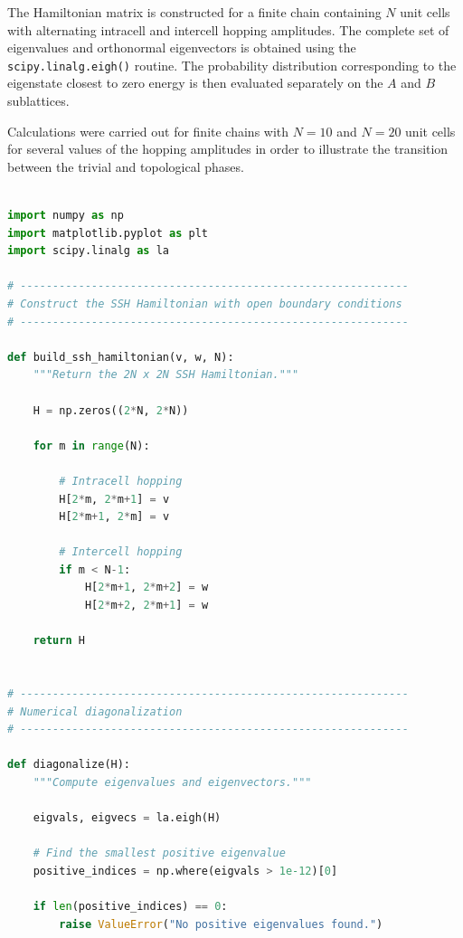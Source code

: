 \documentclass[11pt, a4paper]{article}
\begin{document}
The Hamiltonian matrix is constructed for a finite chain containing \(N\) unit cells with alternating intracell and intercell hopping amplitudes. The complete set of eigenvalues and orthonormal eigenvectors is obtained using the \texttt{scipy.linalg.eigh()} routine. The probability distribution corresponding to the eigenstate closest to zero energy is then evaluated separately on the \(A\) and \(B\) sublattices.

Calculations were carried out for finite chains with \(N=10\) and \(N=20\) unit cells for several values of the hopping amplitudes in order to illustrate the transition between the trivial and topological phases.

\begin{lstlisting}[language=Python,
caption={Python implementation used to construct and diagonalize the finite SSH Hamiltonian with open boundary conditions and generate the corresponding energy spectra and edge-state probability distributions.},
label={lst:ssh_finite}]

import numpy as np
import matplotlib.pyplot as plt
import scipy.linalg as la

# ------------------------------------------------------------
# Construct the SSH Hamiltonian with open boundary conditions
# ------------------------------------------------------------

def build_ssh_hamiltonian(v, w, N):
    """Return the 2N x 2N SSH Hamiltonian."""

    H = np.zeros((2*N, 2*N))

    for m in range(N):

        # Intracell hopping
        H[2*m, 2*m+1] = v
        H[2*m+1, 2*m] = v

        # Intercell hopping
        if m < N-1:
            H[2*m+1, 2*m+2] = w
            H[2*m+2, 2*m+1] = w

    return H


# ------------------------------------------------------------
# Numerical diagonalization
# ------------------------------------------------------------

def diagonalize(H):
    """Compute eigenvalues and eigenvectors."""

    eigvals, eigvecs = la.eigh(H)

    # Find the smallest positive eigenvalue
    positive_indices = np.where(eigvals > 1e-12)[0]

    if len(positive_indices) == 0:
        raise ValueError("No positive eigenvalues found.")


\end{lstlisting}
\end{document}
